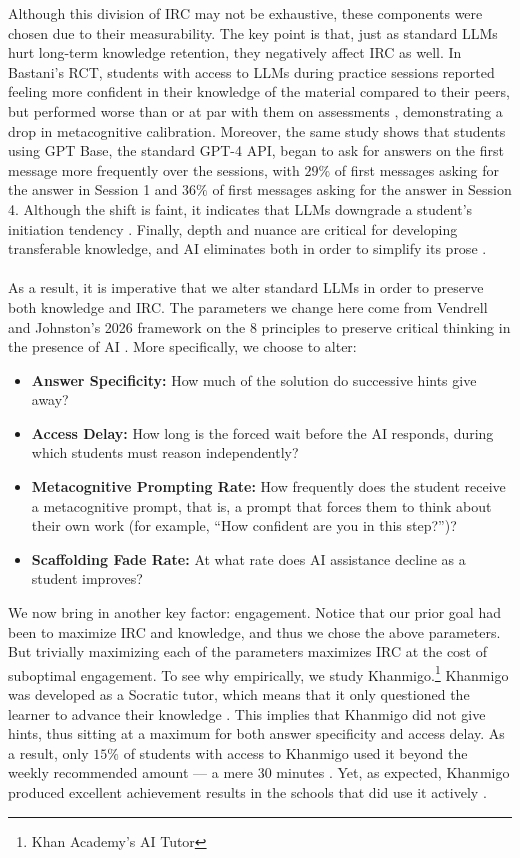 \documentclass[12pt]{article}
\begin{document}
Although this division of IRC may not be exhaustive, these components were chosen due to their measurability. The key point is that, just as standard LLMs hurt long-term knowledge retention, they negatively affect IRC as well. In Bastani's RCT, students with access to LLMs during practice sessions reported feeling more confident in their knowledge of the material compared to their peers, but performed worse than or at par with them on assessments \cite{doi:10.1073/pnas.2422633122}, demonstrating a drop in metacognitive calibration. Moreover, the same study shows that students using GPT Base, the standard GPT-4 API, began to ask for answers on the first message more frequently over the sessions, with $29\%$ of first messages asking for the answer in Session 1 and $36\%$ of first messages asking for the answer in Session 4. Although the shift is faint, it indicates that LLMs downgrade a student's initiation tendency \cite{doi:10.1073/pnas.2422633122}. Finally, depth and nuance are critical for developing transferable knowledge, and AI eliminates both in order to simplify its prose \cite{Vendrell2026Scaffolding}.
\\\\
As a result, it is imperative that we alter standard LLMs in order to preserve both knowledge and IRC. The parameters we change here come from Vendrell and Johnston's 2026 framework on the $8$ principles to preserve critical thinking in the presence of AI \cite{Vendrell2026Scaffolding}. More specifically, we choose to alter:
\begin{itemize}
\item \textbf{Answer Specificity:} How much of the solution do successive hints give away?
\item \textbf{Access Delay:} How long is the forced wait before the AI responds, during which students must reason independently?
\item \textbf{Metacognitive Prompting Rate:} How frequently does the student receive a metacognitive prompt, that is, a prompt that forces them to think about their own work (for example, ``How confident are you in this step?'')?
\item \textbf{Scaffolding Fade Rate:} At what rate does AI assistance decline as a student improves?
\end{itemize}
We now bring in another key factor: engagement. Notice that our prior goal had been to maximize IRC and knowledge, and thus we chose the above parameters. But trivially maximizing each of the parameters maximizes IRC at the cost of suboptimal engagement. To see why empirically, we study Khanmigo.\footnote{Khan Academy's AI Tutor} Khanmigo was developed as a Socratic tutor, which means that it only questioned the learner to advance their knowledge \cite{khan2023harnessing}. This implies that Khanmigo did not give hints, thus sitting at a maximum for both answer specificity and access delay. As a result, only $15\%$ of students with access to Khanmigo used it beyond the weekly recommended amount --- a mere 30 minutes \cite{khanacademy2026learninginopen}. Yet, as expected, Khanmigo produced excellent achievement results in the schools that did use it actively \cite{oreopoulos2026khanacademy}.
\end{document}
